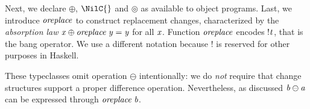 Next, we declare \ensuremath{\oplus }, \ensuremath{\NilC{}} and \ensuremath{\circledcirc } as available to object programs.
%
Last, we introduce \ensuremath{\Varid{oreplace}} to construct replacement
changes, characterized by the \emph{absorption law} \ensuremath{\Varid{x}\oplus \Varid{oreplace}\;\Varid{y}\mathrel{=}\Varid{y}}
for all \ensuremath{\Varid{x}}.
Function \ensuremath{\Varid{oreplace}} encodes \ensuremath{\mathbin{!}\Varid{t}}, that is the bang operator. We use a different
notation because \ensuremath{\mathbin{!}} is reserved for other purposes in Haskell.

These typeclasses omit operation \ensuremath{\ominus } intentionally: we do \emph{not}
require that change structures support a proper difference operation.
Nevertheless, as discussed \ensuremath{\Varid{b}\ominus \Varid{a}} can be expressed through \ensuremath{\Varid{oreplace}\;\Varid{b}}.

